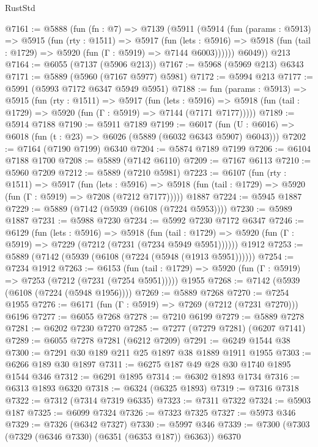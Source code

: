 \begin{lexlean}{RustStd}
\begin{coremodule}
@7161 := @5888
    (fun (fn : @7) =>
    @7139
      (@5911
        (@5914
          (fun (params : @5913) =>
          @5915
            (fun (rty : @1511) =>
            @5917
              (fun (lets : @5916) =>
              @5918 (fun (tail : @1729) => @5920 (fun (Γ : @5919) => @7144 @6003))))))
        @6049))
    @213
@7164 := @6055 (@7137 (@5906 @213))
@7167 := @5968 (@5969 @213) @6343
@7171 := @5889 (@5960 (@7167 @5977) @5981)
@7172 := @5994 @213
@7177 := @5991 (@5993 @7172 @6347 @5949 @5951)
@7188 := fun (params : @5913) =>
  @5915
    (fun (rty : @1511) =>
    @5917
      (fun (lets : @5916) =>
      @5918 (fun (tail : @1729) => @5920 (fun (Γ : @5919) => @7144 (@7171 @7177)))))
@7189 := @5914 @7188
@7190 := @5911 @7189
@7199 := @6017 (fun (U : @6016) => @6018 (fun (t : @23) => @6026 (@5889 (@6032 @6343 @5907) @6043)))
@7202 := @7164 (@7190 @7199) @6340
@7204 := @5874 @7189 @7199
@7206 := @6104 @7188 @1700
@7208 := @5889 (@7142 @6110)
@7209 := @7167 @6113
@7210 := @5960 @7209
@7212 := @5889 (@7210 @5981)
@7223 := @6107
    (fun (rty : @1511) =>
    @5917
      (fun (lets : @5916) =>
      @5918 (fun (tail : @1729) => @5920 (fun (Γ : @5919) => @7208 (@7212 @7177)))))
    @1887
@7224 := @5945 @1887
@7229 := @5889 (@7142 (@5939 (@6108 (@7224 @5953))))
@7230 := @5989 @1887
@7231 := @5988 @7230
@7234 := @5992 @7230 @7172 @6347
@7246 := @6129
    (fun (lets : @5916) =>
    @5918
      (fun (tail : @1729) => @5920 (fun (Γ : @5919) => @7229 (@7212 (@7231 (@7234 @5949 @5951))))))
    @1912
@7253 := @5889 (@7142 (@5939 (@6108 (@7224 (@5948 (@1913 @5951))))))
@7254 := @7234 @1912
@7263 := @6153
    (fun (tail : @1729) => @5920 (fun (Γ : @5919) => @7253 (@7212 (@7231 (@7254 @5951)))))
    @1955
@7268 := @7142 (@5939 (@6108 (@7224 (@5948 @1956))))
@7269 := @5889 @7268
@7270 := @7254 @1955
@7276 := @6171 (fun (Γ : @5919) => @7269 (@7212 (@7231 @7270))) @6196
@7277 := @6055 @7268
@7278 := @7210 @6199
@7279 := @5889 @7278
@7281 := @6202 @7230 @7270
@7285 := @7277 (@7279 @7281) (@6207 @7141)
@7289 := @6055 @7278 @7281 (@6212 @7209)
@7291 := @6249 @1544 @38
@7300 := @7291 @30 @189 @211 @25 @1897 @38 @1889 @1911 @1955
@7303 := @6266 @189 @30 @1897
@7311 := @6275 @187 @49 @28 @30 @1740 @1895 @1544 @346
@7312 := @6291 @1895
@7314 := @6302 @1893 @1734
@7316 := @6313 @1893 @6320
@7318 := @6324 (@6325 @1893)
@7319 := @7316 @7318
@7322 := @7312 (@7314 @7319 @6335)
@7323 := @7311 @7322
@7324 := @5903 @187
@7325 := @6099 @7324
@7326 := @7323 @7325
@7327 := @5973 @346
@7329 := @7326 (@6342 @7327)
@7330 := @5997 @346
@7339 := @7300 (@7303 (@7329 (@6346 @7330) (@6351 (@6353 @187)) @6363)) @6370

\end{coremodule}
\end{lexlean}
